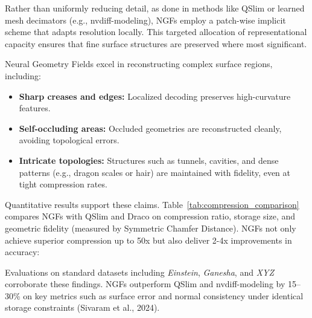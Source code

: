 Rather than uniformly reducing detail, as done in methods like QSlim or learned mesh decimators (e.g., nvdiff-modeling), NGFs employ a patch-wise implicit scheme that adapts resolution locally. 
This targeted allocation of representational capacity ensures that fine surface structures are preserved where most significant. 

Neural Geometry Fields excel in reconstructing complex surface regions, including:
\begin{itemize}
    \item \textbf{Sharp creases and edges:} Localized decoding preserves high-curvature features.
    \item \textbf{Self-occluding areas:} Occluded geometries are reconstructed cleanly, avoiding topological errors.
    \item \textbf{Intricate topologies:} Structures such as tunnels, cavities, and dense patterns (e.g., dragon scales or hair) are maintained with fidelity, even at tight compression rates.
\end{itemize}

Quantitative results support these claims. 
Table~\ref{tab:compression_comparison} compares NGFs with QSlim and Draco on compression ratio, storage size, and geometric fidelity (measured by Symmetric Chamfer Distance). 
NGFs not only achieve superior compression up to 50x but also deliver 2-4x improvements in accuracy: 

\begin{table}[h]
\caption{Compression vs. reconstruction fidelity. Chamfer Distances are scaled by $10^5$ and normalized by the bounding box diagonal.}
\centering
{}
\end{table}

Evaluations on standard datasets including \textit{Einstein}, \textit{Ganesha}, and \textit{XYZ} corroborate these findings. 
NGFs outperform QSlim and nvdiff-modeling by 15--30\% on key metrics such as surface error and normal consistency under identical storage constraints (Sivaram et al., 2024).

